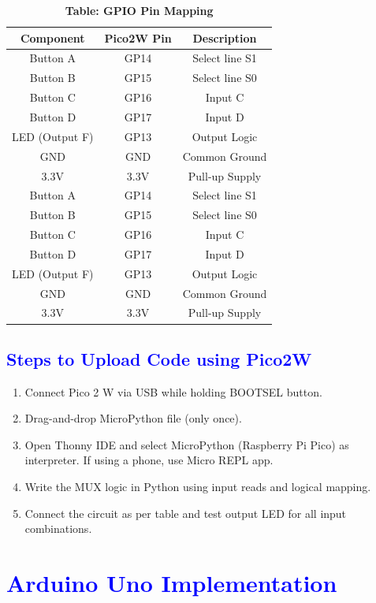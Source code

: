 \documentclass[twocolumn]{article}
\begin{document}
\begin{table}[h]
\centering
\renewcommand{\arraystretch}{1.3}
\begin{tabular}{|c|c|c|}
\hline
\textbf{Component} & \textbf{Pico2W Pin} & \textbf{Description} \\
\hline
Button A & GP14 & Select line S1 \\
Button B & GP15 & Select line S0 \\
Button C & GP16 & Input C \\
Button D & GP17 & Input D \\
LED (Output F) & GP13 & Output Logic \\
GND & GND & Common Ground \\
3.3V & 3.3V & Pull-up Supply \\
\hline
Button A & GP14 & Select line S1 \\
Button B & GP15 & Select line S0 \\
Button C & GP16 & Input C \\
Button D & GP17 & Input D \\
LED (Output F) & GP13 & Output Logic \\
GND & GND & Common Ground \\
3.3V & 3.3V & Pull-up Supply \\
\hline
\end{tabular}
\caption*{\textbf{Table: GPIO Pin Mapping}}
\end{table}

\subsection*{\textcolor{blue}{Steps to Upload Code using Pico2W}}

\begin{enumerate}
    \item Connect Pico 2 W via USB while holding BOOTSEL button.
    \item Drag-and-drop MicroPython file (only once).
    \item Open Thonny IDE and select MicroPython (Raspberry Pi Pico) as interpreter. If using a phone, use Micro REPL app.
    \item Write the MUX logic in Python using input reads and logical mapping.
    \item Connect the circuit as per table and test output LED for all input combinations.
\end{enumerate}
\section*{\textcolor{blue}{Arduino Uno Implementation}}
\end{document}
